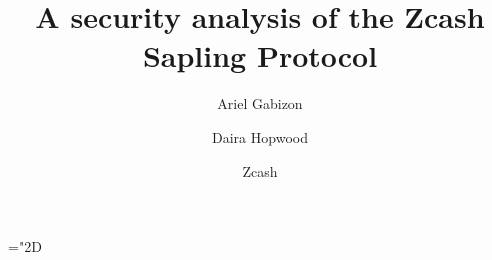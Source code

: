\documentclass[11pt]{article}
\title{%
A security analysis of the Zcash Sapling Protocol}
\author{Ariel Gabizon \and Daira Hopwood}
\date{Zcash}
\numberwithin{equation}{section} %
\numberwithin{figure}{section} %
\newcommand{\set}[1]{\ensuremath{\left\{#1\right\}}\xspace}
\begin{document}
\maketitle
 \mathchardef\mhyphen="2D

\newcommand{\grouppair}{\ensuremath{G^*}\xspace}

\newcommand{\Gt}{\ensuremath{{\mathbb G}_t}\xspace}
\newcommand{\F}{\ensuremath{{\mathbb F}_r}\xspace}
\newcommand{\help}[1]{$#1$-helper\xspace}
\newcommand{\randompair}[1]{\ensuremath{\mathsf{randomPair}(#1)}\xspace}
\newcommand{\pair}[1]{$#1$-pair\xspace}
\newcommand{\pairs}[1]{$#1$-pairs\xspace}
\newcommand{\pubvalsOf}[1]{\ensuremath{\mathrm{pub}(#1)}\xspace}
\newcommand{\pairone}[1]{\G1-$#1$-pair\xspace}
\newcommand{\pairtwo}[1]{\G2-$#1$-pair\xspace}
\newcommand{\sameratio}[2]{\ensuremath{\mathsf{SameRatio}(#1,#2)}\xspace}
\newcommand{\vecc}[2]{\ensuremath{(#1)_{#2}}\xspace}
\newcommand{\players}{\ensuremath{[n]}\xspace}
\newcommand{\ci}{\ensuremath{\mathrm{CI}}\xspace}
\newcommand{\pairvec}[1]{$#1$-vector\xspace}
\newcommand{\Fq}{\ensuremath{\mathbb{F}_q}\xspace}
\newcommand{\sigscheme}{\ensuremath{\mathscr S}\xspace}

\newcommand{\randpair}[1]{\ensuremath{\mathsf{rp}_{#1}}\xspace}
\newcommand{\randpairone}[1]{\ensuremath{\mathsf{rp}_{#1}^{1}}\xspace}

\newcommand{\randpairtwo}[1]{\ensuremath{\mathsf{rp_{#1}^2}}\xspace}%

\newcommand{\pos}{\ensuremath{\mathsf{pos}}\xspace}
\newcommand{\rej}{\ensuremath{\mathsf{rej}}\xspace}
\newcommand{\acc}{\ensuremath{\mathsf{acc}}\xspace}
\newcommand{\sha}[1]{\ensuremath{\mathsf{COMMIT}(#1)}\xspace}
 \newcommand{\shaa}{\ensuremath{\mathsf{COMMIT}}\xspace}
 \newcommand{\comm}[1]{\ensuremath{\mathsf{comm}_{#1}}\xspace}
 \newcommand{\defeq}{:=}
\end{document}
